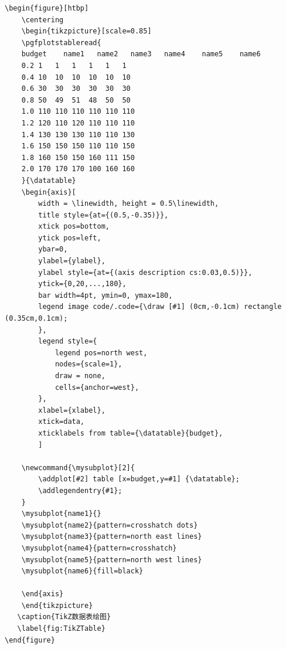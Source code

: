 {\wuhao
\begin{lstlisting}
\begin{figure}[htbp]
    \centering
	\begin{tikzpicture}[scale=0.85]
	\pgfplotstableread{
	budget    name1   name2   name3   name4    name5    name6
	0.2 1   1   1   1   1   1
	0.4 10  10  10  10  10  10
	0.6 30  30  30  30  30  30
	0.8 50  49  51  48  50  50
	1.0 110 110 110 110 110 110
	1.2 120 110 120 110 110 110
	1.4 130 130 130 110 110 130
	1.6 150 150 150 110 110 150
	1.8 160 150 150 160 111 150
	2.0 170 170 170 100 160 160
	}{\datatable}
	\begin{axis}[
	    width = \linewidth, height = 0.5\linewidth,
	    title style={at={(0.5,-0.35)}},
	    xtick pos=bottom,
	    ytick pos=left,
	    ybar=0,
	    ylabel={ylabel},
	    ylabel style={at={(axis description cs:0.03,0.5)}},
	    ytick={0,20,...,180},
	    bar width=4pt, ymin=0, ymax=180,
	    legend image code/.code={\draw [#1] (0cm,-0.1cm) rectangle (0.35cm,0.1cm);
	    },
	    legend style={
	        legend pos=north west,
	        nodes={scale=1},
	        draw = none,
	        cells={anchor=west},
	    },
	    xlabel={xlabel},
	    xtick=data,
	    xticklabels from table={\datatable}{budget},
	    ]

	\newcommand{\mysubplot}[2]{
	    \addplot[#2] table [x=budget,y=#1] {\datatable};
	    \addlegendentry{#1};
	}
	\mysubplot{name1}{}
	\mysubplot{name2}{pattern=crosshatch dots}
	\mysubplot{name3}{pattern=north east lines}
	\mysubplot{name4}{pattern=crosshatch}
	\mysubplot{name5}{pattern=north west lines}
	\mysubplot{name6}{fill=black}

	\end{axis}
	\end{tikzpicture}
   \caption{TikZ数据表绘图}
   \label{fig:TikZTable}
\end{figure}
\end{lstlisting}
}

